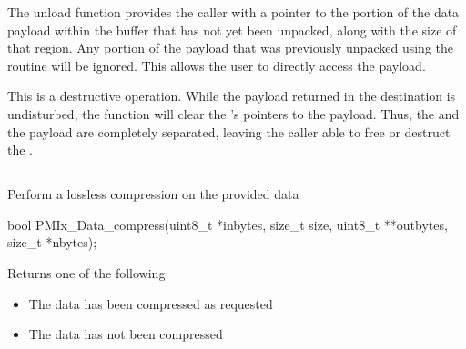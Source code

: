 \descr

The unload function provides the caller with a pointer to the
portion of the data payload within the buffer that has not yet been
unpacked, along with the size of that region. Any portion of
the payload that was previously unpacked using the 
routine will be ignored. This allows the user to directly access the payload.

\adviceuserstart
This is a destructive operation. While the payload returned in the
destination  is
undisturbed, the function will clear the 's pointers to the
payload. Thus, the  and the payload are completely separated,
leaving the caller able to free or destruct the .
\adviceuserend



\subsection{}

\summary

Perform a lossless compression on the provided data

\format

\cspecificstart
\begin{codepar}
bool
PMIx_Data_compress(uint8_t *inbytes, size_t size,
                   uint8_t **outbytes, size_t *nbytes);
\end{codepar}
\cspecificend

\begin{arglist}
\end{arglist}

Returns one of the following:
\begin{itemize}
\item {} The data has been compressed as requested
\item {} The data has not been compressed
\end{itemize}

\descr

